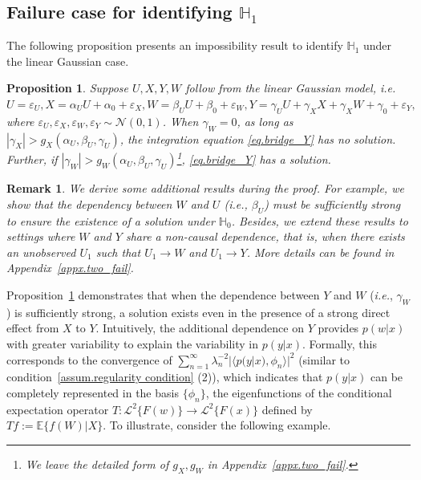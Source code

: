 \documentclass[
  12pt]{article}
\newtheorem{proposition}{Proposition}
\newtheorem{remark}{Remark}
\def\to{\rightarrow}
\def\mE{\mathbb{E}}
\def\mH{\mathbb{H}}
\def\cL{\mathcal{L}}
\def\cN{\mathcal{N}}
\def\mE{\mathbb{E}}
\begin{document}




\subsection{Failure case for identifying $\mH_1$}

The following proposition presents an impossibility result to identify $\mH_1$ under the linear Gaussian case. 

\begin{proposition}
\label{prop.fail}
Suppose $U,X, Y, W$ follow from the linear Gaussian model, \emph{i.e.} $U=\varepsilon_U,X =\alpha_UU + \alpha_0+\varepsilon_X,W =\beta_U U +\beta_0 + \varepsilon_W, Y=\gamma_U U + \gamma_X X + \gamma_X W+\gamma_0 +\varepsilon_Y,$
where $\varepsilon_U,\varepsilon_X,\varepsilon_W,\varepsilon_Y\sim \cN(0,1)$. When $\gamma_W = 0$, as long as $|\gamma_X| > g_X(\alpha_U,\beta_U,\gamma_U)$, the integration equation \eqref{eq.bridge_Y} has no solution. Further, if $|\gamma_W| > g_W(\alpha_U,\beta_U, \gamma_U)$\footnote{We leave the detailed form of $g_X,g_W$ in Appendix~\ref{appx.two_fail}.}, \eqref{eq.bridge_Y} has a solution. 
\end{proposition}
\begin{remark}
    We derive some additional results during the proof. For example, we show that the dependency between $W$ and $U$ (\emph{i.e.}, $\beta_U$) must be sufficiently strong to ensure the existence of a solution under $\mH_0$. Besides, we extend these results to settings where $W$ and $Y$ share a non-causal dependence, that is, when there exists an unobserved $U_1$ such that $U_1 \to W$ and $U_1 \to Y$. More details can be found in  Appendix~\ref{appx.two_fail}. 
\end{remark}
Proposition~\ref{prop.fail} demonstrates that when the dependence between $Y$ and $W$ (\emph{i.e.}, $\gamma_W$) is sufficiently strong, a solution exists even in the presence of a strong direct effect from $X$ to $Y$. Intuitively, the additional dependence on $Y$ provides $p(w|x)$ with greater variability to explain the variability in $p(y|x)$. Formally, this corresponds to the convergence of $\sum_{n=1}^\infty \lambda_n^{-2} |\langle p(y|x),\phi_n \rangle|^2$ (similar to condition~\ref{assum.regularity condition} (2)), 
which indicates that $p(y|x)$ can be completely represented in the basis $\{\phi_n\}$, the eigenfunctions of the conditional expectation operator $T: \cL^2\{F(w)\} \to \cL^2\{F(x)\}$ defined by $Tf := \mE\{f(W)| X \}$. To illustrate, consider the following example. 
\end{document}
